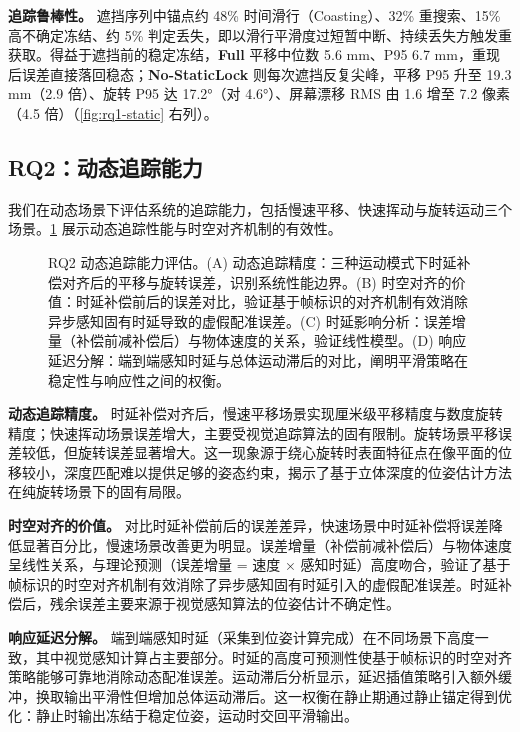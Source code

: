 \documentclass[review]{vgtc}
\begin{document}
\textbf{追踪鲁棒性。} 遮挡序列中锚点约 48\% 时间滑行（Coasting）、32\% 重搜索、15\% 高不确定冻结、约 5\% 判定丢失，即以滑行平滑度过短暂中断、持续丢失方触发重获取。得益于遮挡前的稳定冻结，\textbf{Full} 平移中位数 5.6 mm、P95 6.7 mm，重现后误差直接落回稳态；\textbf{No-StaticLock} 则每次遮挡反复尖峰，平移 P95 升至 19.3 mm（2.9 倍）、旋转 P95 达 17.2°（对 4.6°）、屏幕漂移 RMS 由 1.6 增至 7.2 像素（4.5 倍）（\ref{fig:rq1-static} 右列）。

\subsection{RQ2：动态追踪能力}


我们在动态场景下评估系统的追踪能力，包括慢速平移、快速挥动与旋转运动三个场景。\ref{fig:rq2-dynamic} 展示动态追踪性能与时空对齐机制的有效性。

\begin{figure}[t]
  \centering
  \caption{RQ2 动态追踪能力评估。(A) 动态追踪精度：三种运动模式下时延补偿对齐后的平移与旋转误差，识别系统性能边界。(B) 时空对齐的价值：时延补偿前后的误差对比，验证基于帧标识的对齐机制有效消除异步感知固有时延导致的虚假配准误差。(C) 时延影响分析：误差增量（补偿前减补偿后）与物体速度的关系，验证线性模型。(D) 响应延迟分解：端到端感知时延与总体运动滞后的对比，阐明平滑策略在稳定性与响应性之间的权衡。}
  \label{fig:rq2-dynamic}
\end{figure}


\textbf{动态追踪精度。} 时延补偿对齐后，慢速平移场景实现厘米级平移精度与数度旋转精度；快速挥动场景误差增大，主要受视觉追踪算法的固有限制。旋转场景平移误差较低，但旋转误差显著增大。这一现象源于绕心旋转时表面特征点在像平面的位移较小，深度匹配难以提供足够的姿态约束，揭示了基于立体深度的位姿估计方法在纯旋转场景下的固有局限。

\textbf{时空对齐的价值。} 对比时延补偿前后的误差差异，快速场景中时延补偿将误差降低显著百分比，慢速场景改善更为明显。误差增量（补偿前减补偿后）与物体速度呈线性关系，与理论预测（误差增量 = 速度 × 感知时延）高度吻合，验证了基于帧标识的时空对齐机制有效消除了异步感知固有时延引入的虚假配准误差。时延补偿后，残余误差主要来源于视觉感知算法的位姿估计不确定性。

\textbf{响应延迟分解。} 端到端感知时延（采集到位姿计算完成）在不同场景下高度一致，其中视觉感知计算占主要部分。时延的高度可预测性使基于帧标识的时空对齐策略能够可靠地消除动态配准误差。运动滞后分析显示，延迟插值策略引入额外缓冲，换取输出平滑性但增加总体运动滞后。这一权衡在静止期通过静止锚定得到优化：静止时输出冻结于稳定位姿，运动时交回平滑输出。
\end{document}
